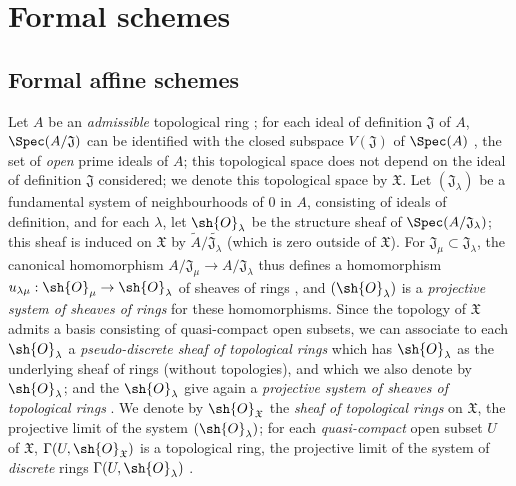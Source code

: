 \section{Formal schemes}
\label{section:I.10}

\subsection{Formal affine schemes}
\label{subsection:I.10.1}

\begin{env}[10.1.1]
\label{I.10.1.1}
Let $A$ be an \emph{admissible} topological ring ; for each ideal of definition $\mathfrak{J}$ of $A$, $\Spec(A/\mathfrak{J})$ can be identified with the closed subspace $V(\mathfrak{J})$ of $\Spec(A)$ , the set of \emph{open} prime ideals of $A$; this topological space does not depend
on the ideal of definition $\mathfrak{J}$ considered; we denote this topological space by $\mathfrak{X}$. Let $(\mathfrak{J}_\lambda)$ be a fundamental system of neighbourhoods of $0$ in $A$, consisting of ideals of definition, and for each $\lambda$, let $\sh{O}_\lambda$ be the structure sheaf of $\Spec(A/\mathfrak{J}_\lambda)$; this sheaf is induced on $\mathfrak{X}$ by $\widetilde{A}/\widetilde{\mathfrak{J}_\lambda}$ (which is zero outside of $\mathfrak{X}$).
For $\mathfrak{J}_\mu\subset\mathfrak{J}_\lambda$, the canonical homomorphism $A/\mathfrak{J}_\mu\to A/\mathfrak{J}_\lambda$ thus defines a homomorphism $u_{\lambda\mu}:\sh{O}_\mu\to\sh{O}_\lambda$ of sheaves of rings , and $(\sh{O}_\lambda)$ is a \emph{projective system of sheaves of rings} for these homomorphisms.
Since the topology of $\mathfrak{X}$ admits a basis consisting of quasi-compact open subsets, we can associate to each $\sh{O}_\lambda$ a \emph{pseudo-discrete sheaf of topological rings}  which has $\sh{O}_\lambda$ as the underlying sheaf of rings (without topologies), and which we also denote by $\sh{O}_\lambda$; and the $\sh{O}_\lambda$ give again a \emph{projective system of sheaves of topological rings} .
We denote by $\sh{O}_\mathfrak{X}$ the \emph{sheaf of topological rings} on $\mathfrak{X}$, the projective limit of the system $(\sh{O}_\lambda)$; for each \emph{quasi-compact} open subset $U$ of $\mathfrak{X}$, $\Gamma(U,\sh{O}_\mathfrak{X})$ is a topological ring, the projective limit of the system of \emph{discrete} rings $\Gamma(U,\sh{O}_\lambda)$ .
\end{env}

